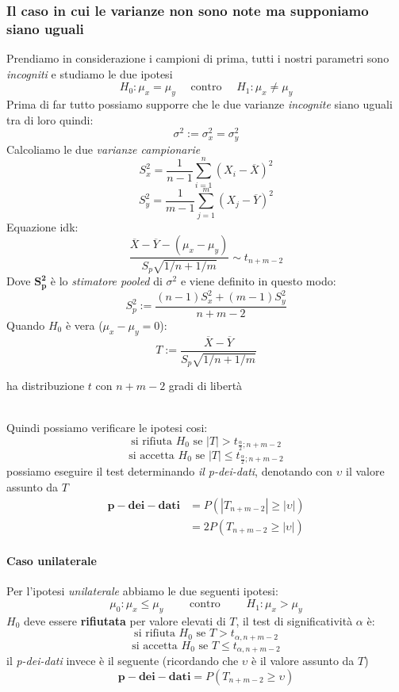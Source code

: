 \documentclass[]{article}
\begin{document}
    \subsubsection{Il caso in cui le varianze non sono note ma supponiamo siano uguali}
    Prendiamo in considerazione i campioni di prima, tutti i nostri parametri sono \textit{incogniti} e studiamo le due ipotesi
    \[ H_0 : \mu_x = \mu_y \quad \text{ contro } \quad H_1 : \mu_x \not = \mu_y \]
    Prima di far tutto possiamo supporre che le due varianze \textit{incognite} siano uguali tra di loro quindi:
    \[ \sigma^2 := \sigma^2_x = \sigma^2_y \]
    Calcoliamo le due \textit{varianze campionarie}
    \[ S^2_x = \frac{1}{n-1} \sum_{i=1}^{n} (X_i - \overline{X})^2 \]
    \[ S^2_y = \frac{1}{m-1} \sum_{j=1}^{m} (X_j - \overline{Y})^2 \]
    Equazione idk:
    \[ \frac{\overline{X} - \overline{Y} - (\mu_x - \mu_y)}{S_p \sqrt{1 / n + 1 / m}} \sim t_{n+m-2}\]
    Dove $\boldsymbol{S^2_p}$ è lo \textit{stimatore pooled} di $\sigma^2$ e viene definito in questo modo:
    \[ S^2_p := \frac{(n-1) S^2_x + (m-1) S^2_y}{n + m -2} \]
    Quando $H_0$ è vera ($\mu_x - \mu_y = 0$):
    \[ T := \frac{\overline{X} - \overline{Y}}{S_p \sqrt{1 / n + 1 /m}} \]
    \centerline{ha distribuzione $t$ con $n + m - 2$ gradi di libertà} \\[2ex]
    Quindi possiamo verificare le ipotesi cosi:
    \[ \text{si rifiuta } H_0 \text{ se }  |T| > t_{\frac{\alpha}{2};n+m-2} \]
    \[ \text{si accetta } H_0 \text{ se }  |T| \leq t_{\frac{\alpha}{2};n+m-2} \]
    possiamo eseguire il test determinando \textit{il p-dei-dati}, denotando con $\upsilon$ il valore assunto da $T$
    \begin{equation*}
        \begin{split}
            \boldsymbol{p-dei-dati} &= P(|T_{n+m-2}| \geq |\upsilon|) \\
            &= 2P(T_{n+m-2} \geq |\upsilon|)
        \end{split}
    \end{equation*}
    \paragraph{Caso unilaterale}
    Per l'ipotesi \textit{unilaterale} abbiamo le due seguenti ipotesi:
    \[ \mu_0 : \mu_x \leq \mu_y \qquad \text{ contro } \qquad H_1 : \mu_x > \mu_y \]
    $H_0$ deve essere \textbf{rifiutata} per valore elevati di $T$, il test di significatività $\alpha$ è:
    \[ \text{si rifiuta } H_0 \text{ se }  T > t_{\alpha, n + m -2} \]
    \[ \text{si accetta } H_0 \text{ se }  T \leq t_{\alpha, n + m -2} \]
    il \textit{p-dei-dati} invece è il seguente (ricordando che $\upsilon$ è il valore assunto da $T$)
    \[ \boldsymbol{p-dei-dati} = P(T_{n+m-2} \geq \upsilon) \]
\end{document}

